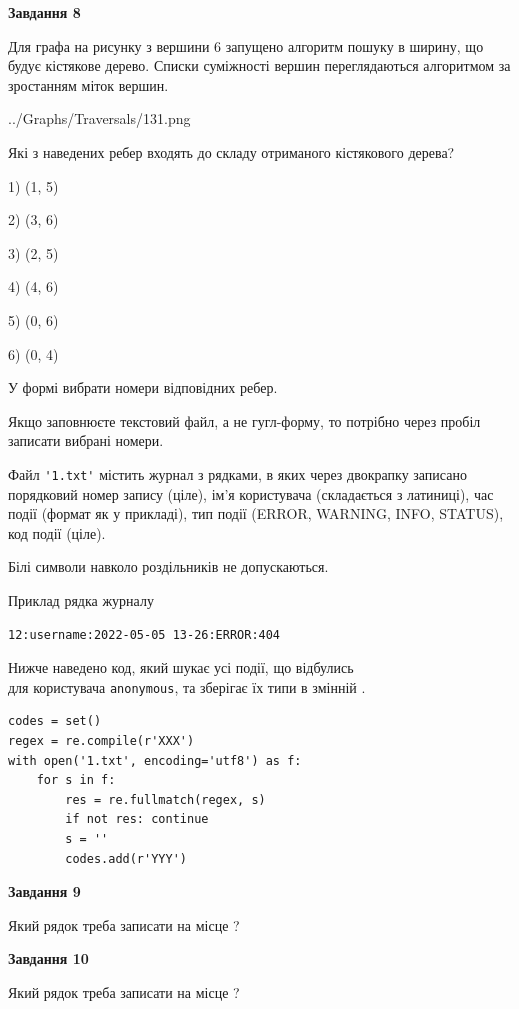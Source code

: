 \documentclass[12pt, ukrainian]{article}
\def\code#1{\Verb!#1!}
\begin{document}
{\begin {large}
{\begin {center}\textbf{Завдання 8}\end {center}}\par
Для графа на рисунку з вершини 6 запущено алгоритм пошуку в ширину, що будує кістякове дерево. Списки суміжності вершин переглядаються алгоритмом за зростанням міток вершин.\par
\begin{center}
	{../Graphs/Traversals/131.png}
\end{center}
\par Які з наведених ребер входять до складу отриманого кістякового дерева?\par
1) (1, 5)\par
2) (3, 6)\par
3) (2, 5)\par
4) (4, 6)\par
5) (0, 6)\par
6) (0, 4)\par
{\vskip 15pt} У формі вибрати номери відповідних ребер.


Якщо заповнюєте текстовий файл, а не гугл-форму, то потрібно через пробіл записа\-ти вибрані номери.\par
\newpage


Файл \code{'1.txt'} містить журнал з рядками, в яких через двокрапку записано поряд\-ко\-вий номер запису (ціле), ім'я користувача (складається з латиниці), час події (фор\-мат як у прикладі), тип події (ERROR, WARNING, INFO, STATUS), код події (ціле).

Білі символи навколо роздільників не допускаються.

Приклад рядка журналу



\begin{verbatim}
12:username:2022-05-05 13-26:ERROR:404
\end{verbatim}


Нижче наведено код, який шукає усі події, що відбулись\\ для користувача \code{anonymous}, та зберігає їх типи в змінній .



\begin{verbatim}
codes = set()
regex = re.compile(r'XXX')
with open('1.txt', encoding='utf8') as f:
    for s in f:
        res = re.fullmatch(regex, s)
        if not res: continue
        s = ''
        codes.add(r'YYY')
\end{verbatim}


{\begin {center}\textbf{Завдання 9}\end {center}}\par
Який рядок треба записати на місце  ?\par
\vspace{5mm}


{\begin {center}\textbf{Завдання 10}\end {center}}\par
Який рядок треба записати на місце  ?\par


\newpage


\end {large}}
\end{document}
